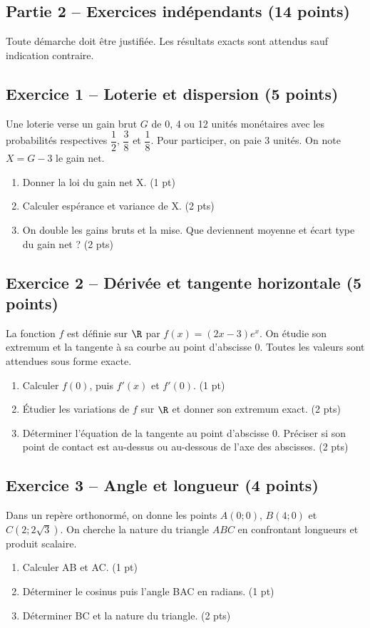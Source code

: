 \clearpage\subsection*{Partie 2 -- Exercices indépendants (14 points)}
Toute démarche doit être justifiée. Les résultats exacts sont attendus sauf indication contraire.
\subsection*{Exercice 1 -- Loterie et dispersion (5 points)}
Une loterie verse un gain brut $G$ de 0, 4 ou 12 unités monétaires avec les probabilités respectives $\dfrac12$, $\dfrac38$ et $\dfrac18$. Pour participer, on paie 3 unités. On note $X=G-3$ le gain net.
\begin{enumerate}
\item Donner la loi du gain net X. \hfill(1 pt)
\item Calculer espérance et variance de X. \hfill(2 pts)
\item On double les gains bruts et la mise. Que deviennent moyenne et écart type du gain net ? \hfill(2 pts)
\end{enumerate}
\subsection*{Exercice 2 -- Dérivée et tangente horizontale (5 points)}
La fonction $f$ est définie sur $\R$ par $f(x)=(2x-3)e^x$. On étudie son extremum et la tangente à sa courbe au point d’abscisse 0. Toutes les valeurs sont attendues sous forme exacte.
\begin{enumerate}
\item Calculer $f(0)$, puis $f\prime(x)$ et $f\prime(0)$. \hfill(1 pt)
\item Étudier les variations de $f$ sur $\R$ et donner son extremum exact. \hfill(2 pts)
\item Déterminer l’équation de la tangente au point d’abscisse 0. Préciser si son point de contact est au-dessus ou au-dessous de l’axe des abscisses. \hfill(2 pts)
\end{enumerate}
\subsection*{Exercice 3 -- Angle et longueur (4 points)}
Dans un repère orthonormé, on donne les points $A(0;0)$, $B(4;0)$ et $C(2;2\sqrt3)$. On cherche la nature du triangle $ABC$ en confrontant longueurs et produit scalaire.
\begin{enumerate}
\item Calculer AB et AC. \hfill(1 pt)
\item Déterminer le cosinus puis l’angle BAC en radians. \hfill(1 pt)
\item Déterminer BC et la nature du triangle. \hfill(2 pts)
\end{enumerate}

